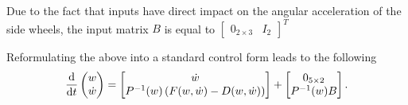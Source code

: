 Due to the fact that inputs have direct impact on the angular acceleration of the side wheels, the input matrix $B$ is equal to $\begin{bmatrix}
0_{2 \times 3} & I_2
\end{bmatrix}^T$ 

Reformulating the above into a standard control form leads to the following
\begin{equation}
\frac{\mathrm{d}}{\mathrm{d} t}\begin{pmatrix}
w \\ \dot w
\end{pmatrix}
 = 
 \begin{bmatrix}
 \dot w \\ P^{-1}(w)\left( F(w, \dot w) - D(w, \dot w) \right)
 \end{bmatrix}+\begin{bmatrix}
 0_{5\times 2} \\ P^{-1}(w)B
 \end{bmatrix}.
\end{equation}
